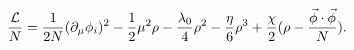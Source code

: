 \begin{equation} 
\frac {\cal L}{N}  = \frac{1}{2 N} (\partial_\mu \phi_i)^2 -
\frac{1}{2}
\mu^2  \rho  -\frac{\lambda_0}{4} \rho^2-
\frac{\eta}{6 }
\rho^3 + \frac{\chi}{2} (\rho - \frac{\vec \phi \cdot \vec \phi}{N}).
\end{equation}

